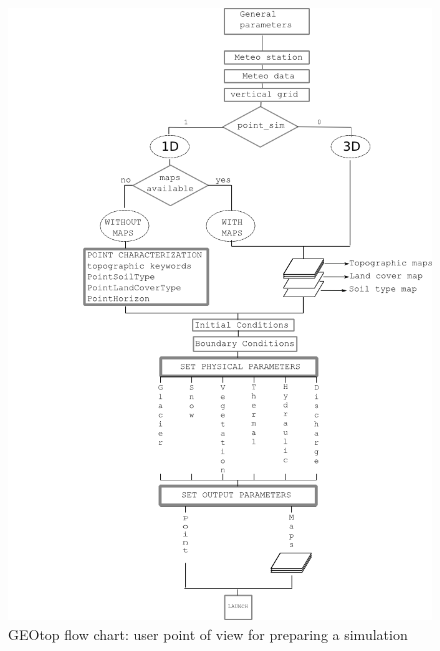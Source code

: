 \begin{figure}[!h]
\centering
\includegraphics[height=0.8\textheight]{./images/pic_flowchart/SCHEMAi.png}
\caption{GEOtop flow chart: user point of view for preparing a simulation}
\label{Fig_sim_flowchart}
\end{figure}


